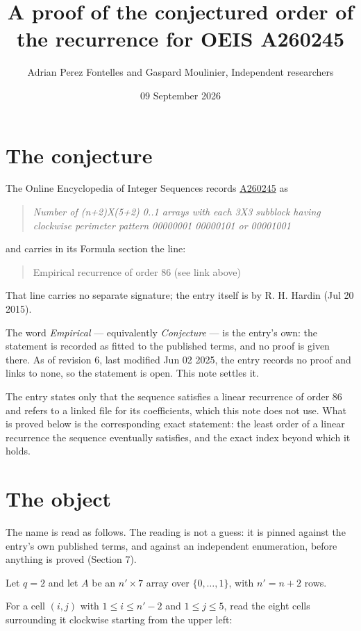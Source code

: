 \documentclass[11pt]{article}
\title{A proof of the conjectured order of the recurrence for OEIS A260245}
\author{Adrian Perez Fontelles and Gaspard Moulinier, Independent researchers}
\date{09 September 2026}
\theoremstyle{definition}
\begin{document}
\maketitle
\section{The conjecture}

The Online Encyclopedia of Integer Sequences records \href{https://oeis.org/A260245}{A260245} as

\begin{quote}\itshape Number of (n+2)X(5+2) 0..1 arrays with each 3X3 subblock having clockwise perimeter pattern 00000001 00000101 or 00001001\end{quote}

and carries in its Formula section the line:

\begin{quote}\ttfamily Empirical recurrence of order 86 (see link above)\end{quote}

That line carries no separate signature; the entry itself is by R. H. Hardin (Jul 20 2015).

The word {\itshape Empirical} --- equivalently {\itshape Conjecture} --- is the entry's own: the statement is recorded as fitted to the published terms, and no proof is given there. As of revision 6, last modified Jun 02 2025, the entry records no proof and links to none, so the statement is open. This note settles it.

The entry states only that the sequence satisfies a linear recurrence of order $86$ and refers to a linked file for its coefficients, which this note does not use. What is proved below is the corresponding exact statement: the least order of a linear recurrence the sequence eventually satisfies, and the exact index beyond which it holds.

\section{The object}

The name is read as follows. The reading is not a guess: it is pinned against the entry's own published terms, and against an independent enumeration, before anything is proved (Section 7).

Let $q = 2$ and let $A$ be an $n' \times 7$ array over $\{0,\dots,1\}$, with $n' = n + 2$ rows.

For a cell $(i,j)$ with $1 \le i \le n'-2$ and $1 \le j \le 5$, read the eight cells surrounding it clockwise starting from the upper left:
\end{document}
